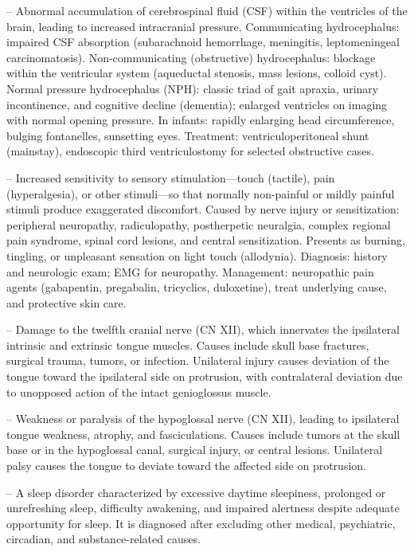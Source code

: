 -- Abnormal accumulation of cerebrospinal fluid (CSF) within the ventricles of the brain, leading to increased intracranial pressure. Communicating hydrocephalus: impaired CSF absorption (subarachnoid hemorrhage, meningitis, leptomeningeal carcinomatosis). Non-communicating (obstructive) hydrocephalus: blockage within the ventricular system (aqueductal stenosis, mass lesions, colloid cyst). Normal pressure hydrocephalus (NPH): classic triad of gait apraxia, urinary incontinence, and cognitive decline (dementia); enlarged ventricles on imaging with normal opening pressure. In infants: rapidly enlarging head circumference, bulging fontanelles, sunsetting eyes. Treatment: ventriculoperitoneal shunt (mainstay), endoscopic third ventriculostomy for selected obstructive cases.

-- Increased sensitivity to sensory stimulation—touch (tactile), pain (hyperalgesia), or other stimuli—so that normally non-painful or mildly painful stimuli produce exaggerated discomfort. Caused by nerve injury or sensitization: peripheral neuropathy, radiculopathy, postherpetic neuralgia, complex regional pain syndrome, spinal cord lesions, and central sensitization. Presents as burning, tingling, or unpleasant sensation on light touch (allodynia). Diagnosis: history and neurologic exam; EMG for neuropathy. Management: neuropathic pain agents (gabapentin, pregabalin, tricyclics, duloxetine), treat underlying cause, and protective skin care.

-- Damage to the twelfth cranial nerve (CN XII), which innervates the ipsilateral intrinsic and extrinsic tongue muscles. Causes include skull base fractures, surgical trauma, tumors, or infection. Unilateral injury causes deviation of the tongue toward the ipsilateral side on protrusion, with contralateral deviation due to unopposed action of the intact genioglossus muscle.

-- Weakness or paralysis of the hypoglossal nerve (CN XII), leading to ipsilateral tongue weakness, atrophy, and fasciculations. Causes include tumors at the skull base or in the hypoglossal canal, surgical injury, or central lesions. Unilateral palsy causes the tongue to deviate toward the affected side on protrusion.

-- A sleep disorder characterized by excessive daytime sleepiness, prolonged or unrefreshing sleep, difficulty awakening, and impaired alertness despite adequate opportunity for sleep. It is diagnosed after excluding other medical, psychiatric, circadian, and substance-related causes.

